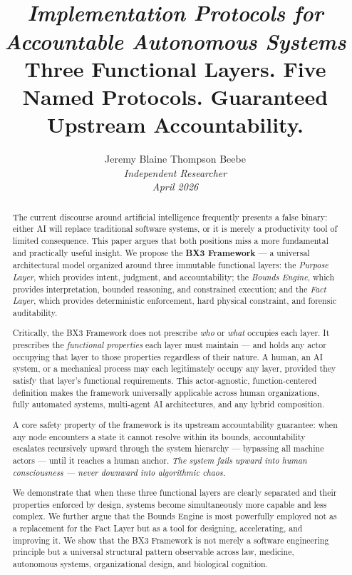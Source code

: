\documentclass[12pt]{article}
\title{\vspace{1.5cm}{\LARGE\textbf{The BX3 Framework:}}\\[0.5em]{\large\textit{Implementation Protocols for Accountable Autonomous Systems}}\\[0.8em]{\normalsize Three Functional Layers. Five Named Protocols. Guaranteed Upstream Accountability.}}
\author{Jeremy Blaine Thompson Beebe\\[0.3em]\textit{Independent Researcher}\\[0.3em]\textit{April 2026}}
\date{}
\begin{document}
\maketitle
\thispagestyle{fancy}

\begin{abstract}
\noindent
The current discourse around artificial intelligence frequently presents a false binary: either AI will replace traditional software systems, or it is merely a productivity tool of limited consequence. This paper argues that both positions miss a more fundamental and practically useful insight. We propose the \textbf{BX3 Framework} --- a universal architectural model organized around three immutable functional layers: the \textit{Purpose Layer}, which provides intent, judgment, and accountability; the \textit{Bounds Engine}, which provides interpretation, bounded reasoning, and constrained execution; and the \textit{Fact Layer}, which provides deterministic enforcement, hard physical constraint, and forensic auditability.

Critically, the BX3 Framework does not prescribe \textit{who} or \textit{what} occupies each layer. It prescribes the \textit{functional properties} each layer must maintain --- and holds any actor occupying that layer to those properties regardless of their nature. A human, an AI system, or a mechanical process may each legitimately occupy any layer, provided they satisfy that layer's functional requirements. This actor-agnostic, function-centered definition makes the framework universally applicable across human organizations, fully automated systems, multi-agent AI architectures, and any hybrid composition.

A core safety property of the framework is its upstream accountability guarantee: when any node encounters a state it cannot resolve within its bounds, accountability escalates recursively upward through the system hierarchy --- bypassing all machine actors --- until it reaches a human anchor. \textit{The system fails upward into human consciousness --- never downward into algorithmic chaos.}

We demonstrate that when these three functional layers are clearly separated and their properties enforced by design, systems become simultaneously more capable and less complex. We further argue that the Bounds Engine is most powerfully employed not as a replacement for the Fact Layer but as a tool for designing, accelerating, and improving it. We show that the BX3 Framework is not merely a software engineering principle but a universal structural pattern observable across law, medicine, autonomous systems, organizational design, and biological cognition.
\end{abstract}
\end{document}
